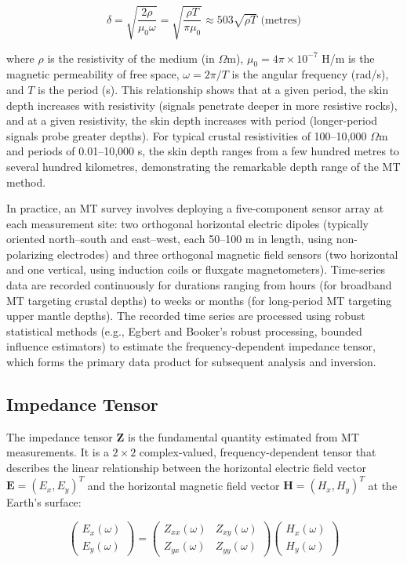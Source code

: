 \begin{equation}
\delta = \sqrt{\frac{2\rho}{\mu_0 \omega}} = \sqrt{\frac{\rho T}{\pi \mu_0}} \approx 503 \sqrt{\rho T} \text{ (metres)}
\end{equation}

\noindent where $\rho$ is the resistivity of the medium (in $\Omega$m), $\mu_0 = 4\pi \times 10^{-7}$ H/m is the magnetic permeability of free space, $\omega = 2\pi/T$ is the angular frequency (rad/s), and $T$ is the period (s). This relationship shows that at a given period, the skin depth increases with resistivity (signals penetrate deeper in more resistive rocks), and at a given resistivity, the skin depth increases with period (longer-period signals probe greater depths). For typical crustal resistivities of 100--10{,}000 $\Omega$m and periods of 0.01--10{,}000 s, the skin depth ranges from a few hundred metres to several hundred kilometres, demonstrating the remarkable depth range of the MT method.

In practice, an MT survey involves deploying a five-component sensor array at each measurement site: two orthogonal horizontal electric dipoles (typically oriented north--south and east--west, each 50--100 m in length, using non-polarizing electrodes) and three orthogonal magnetic field sensors (two horizontal and one vertical, using induction coils or fluxgate magnetometers). Time-series data are recorded continuously for durations ranging from hours (for broadband MT targeting crustal depths) to weeks or months (for long-period MT targeting upper mantle depths). The recorded time series are processed using robust statistical methods (e.g., Egbert and Booker's robust processing, bounded influence estimators) to estimate the frequency-dependent impedance tensor, which forms the primary data product for subsequent analysis and inversion.

\subsection{Impedance Tensor}

The impedance tensor $\mathbf{Z}$ is the fundamental quantity estimated from MT measurements. It is a $2 \times 2$ complex-valued, frequency-dependent tensor that describes the linear relationship between the horizontal electric field vector $\mathbf{E} = (E_x, E_y)^T$ and the horizontal magnetic field vector $\mathbf{H} = (H_x, H_y)^T$ at the Earth's surface:

\begin{equation}
\begin{pmatrix} E_x(\omega) \\ E_y(\omega) \end{pmatrix} = \begin{pmatrix} Z_{xx}(\omega) & Z_{xy}(\omega) \\ Z_{yx}(\omega) & Z_{yy}(\omega) \end{pmatrix} \begin{pmatrix} H_x(\omega) \\ H_y(\omega) \end{pmatrix}
\end{equation}

